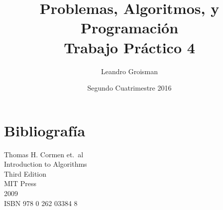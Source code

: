 \documentclass{article}
\title{Problemas, Algoritmos, y Programación \\ Trabajo Práctico 4}
\author{Leandro Groisman}
\date{Segundo Cuatrimestre 2016}
\begin{document}
\maketitle{}

\newpage
\tableofcontents






\section{Bibliografía}

\begin{thebibliography}{9}

	Thomas H. Cormen et.\ al \\
	Introduction to Algorithms \\
	Third Edition \\
	MIT Press \\
	2009 \\
	ISBN 978 0 262 03384 8

\end{thebibliography}
\end{document}
